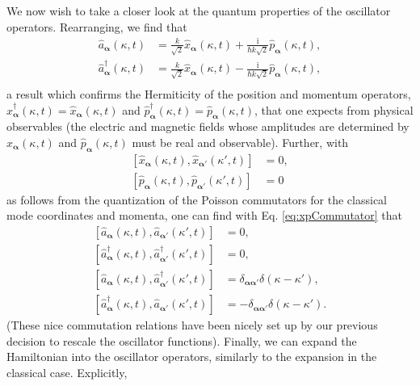 \documentclass{article}
\numberwithin{equation}{section}
\begin{document}
We now wish to take a closer look at the quantum properties of the oscillator operators. Rearranging, we find that
\begin{equation}
\begin{split}
\hat{a}_{\bm{\alpha}}(\kappa,t) &= \frac{k}{\sqrt{2}}\hat{x}_{\bm{\alpha}}(\kappa,t) + \frac{\mathrm{i}}{\hbar k\sqrt{2}}\hat{p}_{\bm{\alpha}}(\kappa,t),\\
\hat{a}_{\bm{\alpha}}^\dagger(\kappa,t) &= \frac{k}{\sqrt{2}}\hat{x}_{\bm{\alpha}}(\kappa,t) - \frac{\mathrm{i}}{\hbar k\sqrt{2}}\hat{p}_{\bm{\alpha}}(\kappa,t),\\
\end{split}
\end{equation}
a result which confirms the Hermiticity of the position and momentum operators, $\hat{x}_{\bm{\alpha}}^\dagger(\kappa,t) = \hat{x}_{\bm{\alpha}}(\kappa,t)$ and $\hat{p}_{\bm{\alpha}}^\dagger(\kappa,t) = \hat{p}_{\bm{\alpha}}(\kappa,t)$, that one expects from physical observables (the electric and magnetic fields whose amplitudes are determined by $\hat{x}_{\bm{\alpha}}(\kappa,t)$ and $\hat{p}_{\bm{\alpha}}(\kappa,t)$ must be real and observable). Further, with
\begin{equation}
\begin{split}
[\hat{x}_{\bm{\alpha}}(\kappa,t),\hat{x}_{\bm{\alpha}'}(\kappa',t)] &= 0,\\
[\hat{p}_{\bm{\alpha}}(\kappa,t),\hat{p}_{\bm{\alpha}'}(\kappa',t)] &= 0
\end{split}
\end{equation}
as follows from the quantization of the Poisson commutators for the classical mode coordinates and momenta, one can find with Eq. \eqref{eq:xpCommutator} that
\begin{equation}
\begin{split}
[\hat{a}_{\bm{\alpha}}(\kappa,t),\hat{a}_{\bm{\alpha}'}(\kappa',t)] &= 0,\\
[\hat{a}_{\bm{\alpha}}^\dagger(\kappa,t),\hat{a}_{\bm{\alpha}'}^\dagger(\kappa',t)] &= 0,\\
[\hat{a}_{\bm{\alpha}}(\kappa,t),\hat{a}_{\bm{\alpha}'}^\dagger(\kappa',t)] &= \delta_{\bm{\alpha}\bm{\alpha}'}\delta(\kappa - \kappa'),\\
[\hat{a}_{\bm{\alpha}}^\dagger(\kappa,t),\hat{a}_{\bm{\alpha}'}(\kappa',t)] &= -\delta_{\bm{\alpha}\bm{\alpha}'}\delta(\kappa - \kappa').
\end{split}
\end{equation}
(These nice commutation relations have been nicely set up by our previous decision to rescale the oscillator functions). Finally, we can expand the Hamiltonian into the oscillator operators, similarly to the expansion in the classical case. Explicitly,
\end{document}
